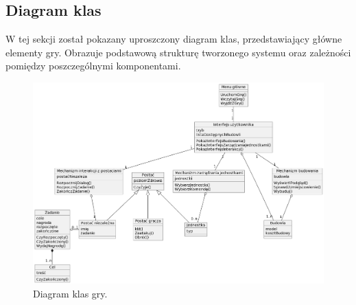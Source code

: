 \subsection{Diagram klas}\label{ss:class}
W tej sekcji został pokazany uproszczony diagram klas, przedstawiający główne elementy gry. Obrazuje podstawową
strukturę tworzonego systemu oraz zależności pomiędzy poszczególnymi komponentami.
\begin{figure}[!htbp]
    \centering
    \includegraphics[width=textwidth]{images/diagrams/class.png}
    \caption{Diagram klas gry.}\label{fig:classes}
\end{figure}